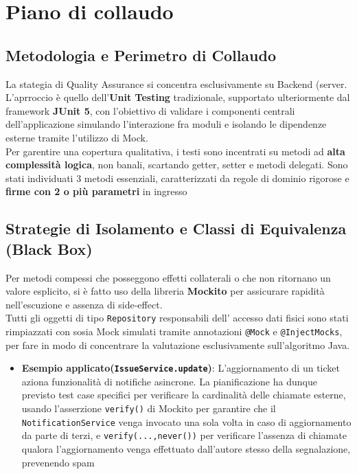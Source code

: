 \newpage
\chapter{Piano di collaudo}
\section{Metodologia e Perimetro di Collaudo}
La stategia di Quality Assurance si concentra esclusivamente su Backend (server. L'aprroccio è quello dell'\textbf{Unit Testing} tradizionale, supportato ulteriormente dal framework \textbf{JUnit 5}, con l'obiettivo di validare i componenti centrali dell'applicazione simulando l'interazione fra moduli e isolando le dipendenze esterne tramite l'utilizzo di Mock.
\\
Per garentire una copertura qualitativa, i testi sono incentrati su metodi ad \textbf{alta complessità logica},  non banali, scartando getter, setter e metodi delegati.
Sono stati individuati 3 metodi essenziali, caratterizzati da regole di dominio rigorose e \textbf{firme con 2 o più parametri} in ingresso

\section{Strategie di Isolamento e Classi di Equivalenza (Black Box)}
Per metodi compessi che posseggono effetti collaterali o che non ritornano un valore esplicito, si è fatto uso della libreria \textbf{Mockito} per assicurare rapidità nell'escuzione e assenza di side-effect. \\
Tutti gli oggetti di tipo \texttt{Repository} responsabili dell' accesso dati fisici sono stati rimpiazzati con sosia Mock simulati tramite annotazioni \texttt{@Mock} e \texttt{@InjectMocks}, per fare in modo di concentrare la valutazione esclusivamente sull'algoritmo Java.
\begin{itemize}
    \item \textbf{Esempio applicato(\texttt{IssueService.update})}: L'aggiornamento di un ticket aziona funzionalità di notifiche asincrone. La pianificazione ha dunque previsto test case specifici per verificare la cardinalità delle chiamate esterne, usando l'asserzione \texttt{verify()} di Mockito per garantire che il \texttt{NotificationService} venga invocato una sola volta in caso di aggiornamento da parte di terzi, e \texttt{verify(...,never())} per verificare l'assenza di chiamate qualora l'aggiornamento venga effettuato dall'autore stesso della segnalazione, prevenendo spam
\end{itemize}

